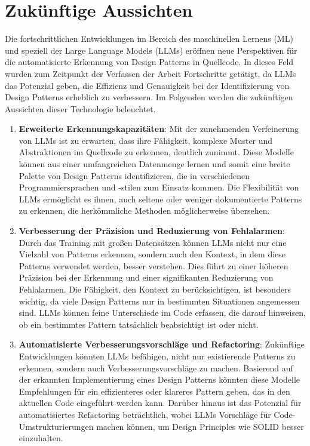 \section{Zukünftige Aussichten}

Die fortschrittlichen Entwicklungen im Bereich des maschinellen Lernens (ML) und speziell der Large Language Models (LLMs) eröffnen neue Perspektiven für die automatisierte Erkennung von Design Patterns in Quellcode. In dieses Feld wurden zum Zeitpunkt der Verfassen der Arbeit Fortschritte getätigt, da LLMs das Potenzial geben, die Effizienz und Genauigkeit bei der Identifizierung von Design Patterns erheblich zu verbessern. Im Folgenden werden die zukünftigen Aussichten dieser Technologie beleuchtet.

\begin{enumerate}
    \item \textbf{Erweiterte Erkennungskapazitäten}: Mit der zunehmenden Verfeinerung von LLMs ist zu erwarten, dass ihre Fähigkeit, komplexe Muster und Abstraktionen im Quellcode zu erkennen, deutlich zunimmt. Diese Modelle können aus einer umfangreichen Datenmenge lernen und somit eine breite Palette von Design Patterns identifizieren, die in verschiedenen Programmiersprachen und -stilen zum Einsatz kommen. Die Flexibilität von LLMs ermöglicht es ihnen, auch seltene oder weniger dokumentierte Patterns zu erkennen, die herkömmliche Methoden möglicherweise übersehen.
    \item \textbf{Verbesserung der Präzision und Reduzierung von Fehlalarmen}: Durch das Training mit großen Datensätzen können LLMs nicht nur eine Vielzahl von Patterns erkennen, sondern auch den Kontext, in dem diese Patterns verwendet werden, besser verstehen. Dies führt zu einer höheren Präzision bei der Erkennung und einer signifikanten Reduzierung von Fehlalarmen. Die Fähigkeit, den Kontext zu berücksichtigen, ist besonders wichtig, da viele Design Patterns nur in bestimmten Situationen angemessen sind. LLMs können feine Unterschiede im Code erfassen, die darauf hinweisen, ob ein bestimmtes Pattern tatsächlich beabsichtigt ist oder nicht.
    \item \textbf{Automatisierte Verbesserungsvorschläge und Refactoring}: Zukünftige Entwicklungen könnten LLMs befähigen, nicht nur existierende Patterns zu erkennen, sondern auch Verbesserungsvorschläge zu machen. Basierend auf der erkannten Implementierung eines Design Patterns könnten diese Modelle Empfehlungen für ein effizienteres oder klareres Pattern geben, das in den aktuellen Code eingeführt werden kann. Darüber hinaus ist das Potenzial für automatisiertes Refactoring beträchtlich, wobei LLMs Vorschläge für Code-Umstrukturierungen machen können, um Design Principles wie SOLID besser einzuhalten.

\end{enumerate}
